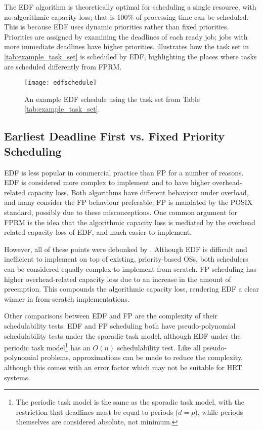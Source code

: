 The \gls{EDF} algorithm is theoretically optimal for scheduling a single resource, with no
algorithmic capacity loss; that is 100\% of processing time can be scheduled. This is because
\gls{EDF} uses dynamic priorities rather than fixed priorities. 
Priorities are assigned by examining the deadlines of each ready job; jobs with more immediate deadlines have higher priorities.
 illustrates how the task set in \cref{tab:example_task_set} is scheduled by
\gls{EDF}, highlighting the places where tasks are scheduled differently from FPRM.

\begin{figure}
	\begin{center}
		\leavevmode
		\texttt{[image: edfschedule]}
		\caption{An example EDF schedule using the task set from Table \ref{tab:example_task_set}.}
		\label{f:edf-schedule}
	\end{center}
\end{figure}

\subsection{Earliest Deadline First vs. Fixed Priority Scheduling}
\label{s:overload}

\gls{EDF} is less popular in commercial practice than \gls{FP} for a number of reasons.  \gls{EDF}
is considered more complex to implement and to have higher overhead-related capacity loss.
Both algorithms have different behaviour under overload, and many consider the \gls{FP} behaviour
preferable. \gls{FP}
is mandated by the POSIX standard, possibly due to these misconceptions. One common argument for
\gls{FPRM} is the idea that the algorithmic capacity loss is mediated by the overhead related
capacity loss of \gls{EDF}, and much easier to implement. 

However, all of these points were debunked by \citet{Buttazzo_05}.  Although \gls{EDF} is difficult
and inefficient to implement on top of existing, priority-based \glspl{OS}, both schedulers
can be considered equally complex to implement from scratch.  \gls{FP} scheduling has higher
overhead-related capacity loss due to an increase in the amount of preemption.  This compounds the
algorithmic capacity loss, rendering \gls{EDF} a clear winner in from-scratch implementations.

Other comparisons between \gls{EDF} and \gls{FP} are the complexity of their schedulability tests.
\gls{EDF} and \gls{FP} scheduling both have pseudo-polynomial
schedulability tests under the sporadic task model, although \gls{EDF} under the periodic task
model\footnote{The periodic task model is the same as the sporadic task model, with the restriction
that deadlines must be equal to periods ($d = p$), while periods themselves are considered absolute,
not minimum.} has an $O(n)$ schedulability test.  Like all pseudo-polynomial problems,
approximations can be made to reduce the complexity, although this comes with an error factor which
may not be suitable for \gls{HRT} systems.  

